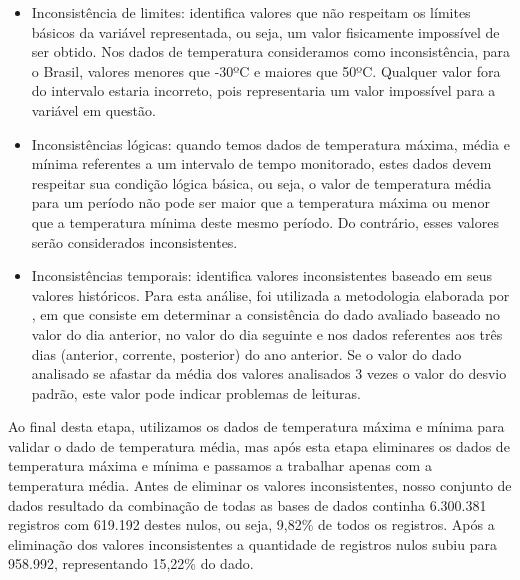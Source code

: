 \begin{itemize}
	\item Inconsistência de limites: identifica valores que não respeitam os límites básicos da variável representada, ou seja, um valor fisicamente impossível de ser obtido. Nos dados de temperatura consideramos como inconsistência, para o Brasil, valores menores que -30ºC e maiores que 50ºC. Qualquer valor fora do intervalo estaria incorreto, pois representaria um valor impossível para a variável em questão.
	\item Inconsistências lógicas: quando temos dados de temperatura máxima, média e mínima referentes a um intervalo de tempo monitorado, estes dados devem respeitar sua condição lógica básica, ou seja, o valor de temperatura média para um período não pode ser maior que a temperatura máxima ou menor que a temperatura mínima deste mesmo período. Do contrário, esses valores serão considerados inconsistentes.     
	\item Inconsistências temporais: identifica valores inconsistentes baseado em seus valores históricos. Para esta análise, foi utilizada a metodologia elaborada por \cite{mateo2008design}, em que consiste em determinar a consistência do dado avaliado baseado no valor do dia anterior, no valor do dia  seguinte e nos dados referentes aos três dias (anterior, corrente, posterior) do ano anterior. Se o valor do dado analisado se afastar da média dos valores analisados 3 vezes o valor do desvio padrão, este valor pode indicar problemas de leituras.  
\end{itemize}

Ao final desta etapa, utilizamos os dados de temperatura máxima e mínima para validar o dado de temperatura média, mas após esta etapa eliminares os dados de temperatura máxima e mínima e passamos a trabalhar apenas com a temperatura média. Antes de eliminar os valores inconsistentes, nosso conjunto de dados resultado da combinação de todas as bases de dados continha 6.300.381 registros com 619.192 destes nulos, ou seja, 9,82\% de todos os registros. Após a eliminação dos valores inconsistentes a quantidade de registros nulos subiu para 958.992, representando 15,22\% do dado. 

\renewcommand{\cleardoublepage}{}
\renewcommand{\clearpage}{}
\vspace{5mm}